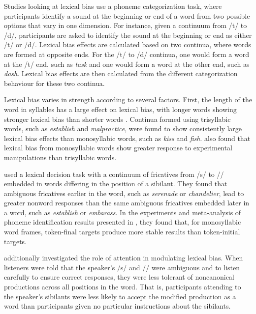 \documentclass[11pt]{article} %
\begin{document}
Studies looking at lexical bias use a phoneme categorization task, where participants identify a sound at the beginning or end of a word from two possible options that vary in one dimension.  For instance, given a continuum from /t/ to /d/, participants are asked to identify the sound at the beginning or end as either /t/ or /d/.  Lexical bias effects are calculated based on two continua, where words are formed at opposite ends.  For the /t/ to /d/ continua, one would form a word at the /t/ end, such as \emph{task} and one would form a word at the other end, such as \emph{dash}.  Lexical bias effects are then calculated from the different categorization behaviour for these two continua.

Lexical bias varies in strength according to several factors.  First, the length of the word in syllables has a large effect on lexical bias, with longer words showing stronger lexical bias than shorter words \citep{Pitt2006}.  Continua formed using trisyllabic words, such as \emph{establish} and \emph{malpractice}, were found to show consistently large lexical bias effects than monosyllabic words, such as \emph{kiss} and \emph{fish}.  \citet{Pitt2006} also found that lexical bias from monosyllabic words show greater response to experimental manipulations than trisyllabic words.

\citet{Pitt2012} used a lexical decision task with a continuum of fricatives from /s/ to /\textesh/ embedded in words differing in the position of a sibilant.  They found that ambiguous fricatives earlier in the word, such as \emph{serenade} or \emph{chandelier}, lead to greater nonword responses than the same ambiguous fricatives embedded later in a word, such as \emph{establish} or \emph{embarass}.  In the experiments and meta-analysis of phoneme identification results presented in \citet{Pitt1993}, they found that, for monosyllabic word frames, token-final targets produce more stable results than token-initial targets.

\citet{Pitt2012} additionally investigated the role of attention in modulating lexical bias.  When listeners were told that the speaker's /s/ and /\textesh/ were ambiguous and to listen carefully to ensure correct responses, they were less tolerant of noncanonical productions across all positions in the word.  That is, participants attending to the speaker's sibilants were less likely to accept the modified production as a word than participants given no particular instructions about the sibilants.
\end{document}
